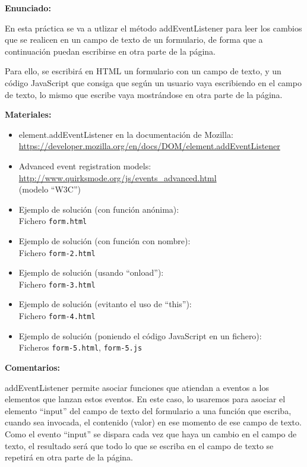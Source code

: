 \textbf{Enunciado:}

En esta práctica se va a utlizar el método addEventListener para leer los cambios que se realicen en un campo de texto de un formulario, de forma que a continuación puedan escribirse en otra parte de la página.

Para ello, se escribirá en HTML un formulario con un campo de texto, y un código JavaScript que consiga que según un usuario vaya escribiendo en el campo de texto, lo mismo que escribe vaya mostrándose en otra parte de la página.

\textbf{Materiales:}

\begin{itemize}
\item element.addEventListener en la documentación de Mozilla: \\
  \url{https://developer.mozilla.org/en/docs/DOM/element.addEventListener}
\item Advanced event registration models: \\
  \url{http://www.quirksmode.org/js/events_advanced.html} \\
  (modelo ``W3C'')
\item Ejemplo de solución (con función anónima): \\
  Fichero \verb|form.html|
\item Ejemplo de solución (con función con nombre): \\
  Fichero \verb|form-2.html|
\item Ejemplo de solución (usando ``onload''): \\
  Fichero \verb|form-3.html|
\item Ejemplo de solución (evitanto el uso de ``this''): \\
  Fichero \verb|form-4.html|
\item Ejemplo de solución (poniendo el código JavaScript en un fichero): \\
  Ficheros \verb|form-5.html|, \verb|form-5.js|
\end{itemize}

\textbf{Comentarios:}

addEventListener permite asociar funciones que atiendan a eventos a los elementos que lanzan estos eventos. En este caso, lo usaremos para asociar el elemento ``input'' del campo de texto del formulario a una función que escriba, cuando sea invocada, el contenido (valor) en ese momento de ese campo de texto. Como el evento ``input'' se dispara cada vez que haya un cambio en el campo de texto, el resultado será que todo lo que se escriba en el campo de texto se repetirá en otra parte de la página.

